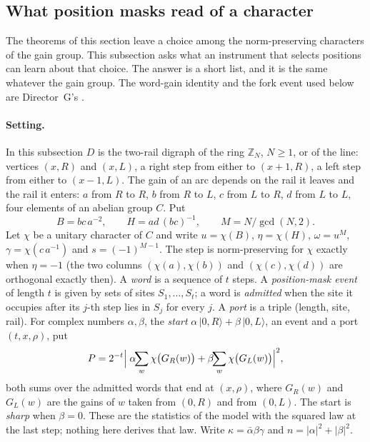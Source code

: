 
\subsection{What position masks read of a character}

The theorems of this section leave a choice among the norm-preserving characters of the gain group. This subsection asks what an instrument that selects positions can learn about that choice. The answer is a short list, and it is the same whatever the gain group. The word-gain identity and the fork event used below are Director~G's \cite{dgfour}.

\paragraph{Setting.} In this subsection $D$ is the two-rail digraph of the ring $\mathbb{Z}_N$, $N\ge1$, or of the line: vertices $(x,R)$ and $(x,L)$, a right step from either to $(x+1,R)$, a left step from either to $(x-1,L)$. The gain of an arc depends on the rail it leaves and the rail it enters: $a$ from $R$ to $R$, $b$ from $R$ to $L$, $c$ from $L$ to $R$, $d$ from $L$ to $L$, four elements of an abelian group $C$. Put
\[
B=bc\,a^{-2},\qquad H=ad\,(bc)^{-1},\qquad M=N/\gcd(N,2).
\]
Let $\chi$ be a unitary character of $C$ and write $u=\chi(B)$, $\eta=\chi(H)$, $\omega=u^{M}$, $\gamma=\chi(c\,a^{-1})$ and $s=(-1)^{M-1}$. The step is norm-preserving for $\chi$ exactly when $\eta=-1$ (the two columns $(\chi(a),\chi(b))$ and $(\chi(c),\chi(d))$ are orthogonal exactly then). A \emph{word} is a sequence of $t$ steps. A \emph{position-mask event} of length $t$ is given by sets of sites $S_1,\dots,S_t$; a word is \emph{admitted} when the site it occupies after its $j$-th step lies in $S_j$ for every $j$. A \emph{port} is a triple (length, site, rail). For complex numbers $\alpha,\beta$, the \emph{start} $\alpha\,|0,R\rangle+\beta\,|0,L\rangle$, an event and a port $(t,x,\rho)$, put
\begin{equation}\label{eq:portprob}
P=2^{-t}\Bigl|\;\alpha\!\!\sum_{w}\chi\bigl(G_R(w)\bigr)+\beta\!\!\sum_{w}\chi\bigl(G_L(w)\bigr)\Bigr|^{2},
\end{equation}
both sums over the admitted words that end at $(x,\rho)$, where $G_R(w)$ and $G_L(w)$ are the gains of $w$ taken from $(0,R)$ and from $(0,L)$. The start is \emph{sharp} when $\beta=0$. These are the statistics of the model with the squared law at the last step; nothing here derives that law. Write $\kappa=\bar\alpha\beta\gamma$ and $n=|\alpha|^{2}+|\beta|^{2}$.


